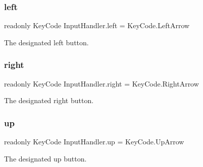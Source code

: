 \mbox{\label{class_input_handler_a56211f2a1a7fa97f538e0fcf25f20208}} 
\subsubsection{\texorpdfstring{left}{left}}
{\footnotesize\ttfamily readonly Key\+Code Input\+Handler.\+left = Key\+Code.\+Left\+Arrow}



The designated left button. 

\mbox{\label{class_input_handler_a4cfd6097eeeb93e5b51e94c76459f80f}} 
\subsubsection{\texorpdfstring{right}{right}}
{\footnotesize\ttfamily readonly Key\+Code Input\+Handler.\+right = Key\+Code.\+Right\+Arrow}



The designated right button. 

\mbox{\label{class_input_handler_aad98122542322e661a5ce08de06ddcff}} 
\subsubsection{\texorpdfstring{up}{up}}
{\footnotesize\ttfamily readonly Key\+Code Input\+Handler.\+up = Key\+Code.\+Up\+Arrow}



The designated up button. 

